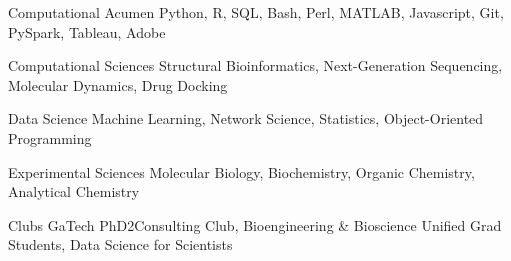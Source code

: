 \vspace{2mm}

\begin{cvskills}
    
  \cvskill
    {Computational Acumen} %
    {Python, R, SQL, Bash, Perl, MATLAB, Javascript, Git, PySpark, Tableau, Adobe} %
    
  \cvskill
    {Computational Sciences} %
    {Structural Bioinformatics, Next-Generation Sequencing, Molecular Dynamics, Drug Docking} %
     
  \cvskill
    {Data Science} %
    {Machine Learning, Network Science, Statistics, Object-Oriented Programming} %
    
  \cvskill
    {Experimental Sciences} %
    {Molecular Biology, Biochemistry, Organic Chemistry, Analytical Chemistry} %
    
  \cvskill
    {Clubs} %
    {GaTech PhD2Consulting Club, Bioengineering \& Bioscience Unified Grad Students, Data Science for Scientists} %
	
	\vspace{-8.0mm}
\end{cvskills}